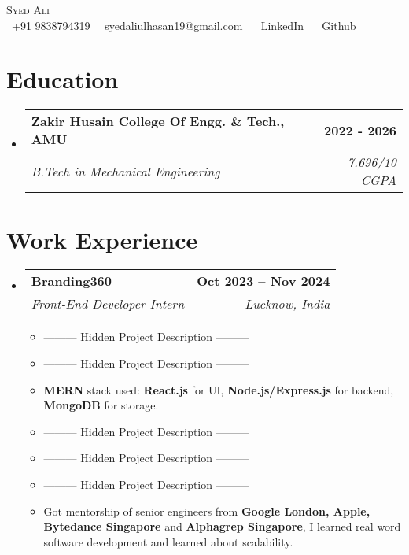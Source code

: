 \documentclass[letterpaper,11pt]{article}
\makeatletter
\newcommand{\resumeItem}[1]{
  \item\small{
    {#1 \vspace{-2pt}}
  }
}
\newcommand{\resumeSubheading}[4]{
  \vspace{-2pt}\item
    \begin{tabular*}{1.0\textwidth}[t]{l@{\extracolsep{\fill}}r}
      \textbf{#1} & \textbf{\small #2} \\
      \textit{\small#3} & \textit{\small #4} \\
    \end{tabular*}\vspace{-7pt}
}
\newcommand{\resumeSubHeadingListStart}{\begin{itemize}[leftmargin=0.0in, label={}]}
\newcommand{\resumeSubHeadingListEnd}{\end{itemize}}
\newcommand{\resumeItemListStart}{\begin{itemize}}
\newcommand{\resumeItemListEnd}{\end{itemize}\vspace{-5pt}}
\makeatother
\begin{document}
\begin{center}
  {\Huge \scshape Syed Ali} \\ \vspace{5pt}
  \small \raisebox{-0.1\height}\faPhone\ +91 9838794319~ \href{mailto:admissions@algouniversity.com.com}{\raisebox{-0.2\height}\faEnvelope\  \underline{syedaliulhasan19@gmail.com}} ~
  \href{https://algouniversity.com/accelerator}{\raisebox{-0.2\height}\faLinkedin\ \underline{LinkedIn}}  ~
  \href{https://bit.ly/accelerator-2023}{\raisebox{-0.2\height}\faGithub\ \underline{Github}}
  \vspace{-8pt}
\end{center}

\vspace{-10pt}
\section{Education}
\resumeSubHeadingListStart
\resumeSubheading
{Zakir Husain College Of Engg. \& Tech., AMU}{2022 - 2026}{B.Tech in Mechanical Engineering}{7.696/10 CGPA}
\resumeSubHeadingListEnd
\vspace{-15pt}



\section{Work Experience}
\resumeSubHeadingListStart

\resumeSubheading
{Branding360}{Oct 2023 -- Nov 2024}
{Front-End Developer Intern}{Lucknow, India}
\resumeItemListStart
\resumeItem{  ---------  Hidden Project Description  ---------  }
\resumeItem{  ---------  Hidden Project Description  ---------  }

\resumeItem{\textbf{MERN} stack used: \textbf{React.js} for UI,         \textbf{Node.js/Express.js} for backend, \textbf{MongoDB} for storage.}

\resumeItem{  ---------  Hidden Project Description  ---------  }
\resumeItem{  ---------  Hidden Project Description  ---------  }

\resumeItem{  ---------  Hidden Project Description  ---------  }

\resumeItem{Got mentorship of senior engineers from \textbf{Google London, Apple, Bytedance Singapore} and \textbf{Alphagrep Singapore}, I learned real word software development and learned about scalability.}
\resumeItemListEnd
\resumeSubHeadingListEnd
\vspace{-16pt}
\end{document}
